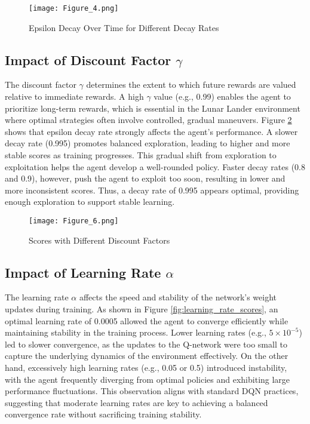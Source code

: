 \documentclass[conference]{IEEEtran}
\begin{document}
\begin{figure}[h]
    \centering
    \texttt{[image: Figure\_4.png]}
    \caption{Epsilon Decay Over Time for Different Decay Rates}
    \label{fig:epsilon_decay_over_time}
\end{figure}

\subsection{Impact of Discount Factor $\gamma$}
The discount factor $\gamma$ determines the extent to which future rewards are valued relative to immediate rewards. A high $\gamma$ value (e.g., 0.99) enables the agent to prioritize long-term rewards, which is essential in the Lunar Lander environment where optimal strategies often involve controlled, gradual maneuvers. Figure \ref{fig:gamma_scores} shows that epsilon decay rate strongly affects the agent’s performance. A slower decay rate (0.995) promotes balanced exploration, leading to higher and more stable scores as training progresses. This gradual shift from exploration to exploitation helps the agent develop a well-rounded policy. Faster decay rates (0.8 and 0.9), however, push the agent to exploit too soon, resulting in lower and more inconsistent scores. Thus, a decay rate of 0.995 appears optimal, providing enough exploration to support stable learning.

\begin{figure}[h]
    \centering
    \texttt{[image: Figure\_6.png]}
    \caption{Scores with Different Discount Factors}
    \label{fig:gamma_scores}
\end{figure}

\subsection{Impact of Learning Rate $\alpha$}
The learning rate $\alpha$ affects the speed and stability of the network's weight updates during training. As shown in Figure \ref{fig:learning_rate_scores}, an optimal learning rate of 0.0005 allowed the agent to converge efficiently while maintaining stability in the training process. Lower learning rates (e.g., $5 \times 10^{-5}$) led to slower convergence, as the updates to the Q-network were too small to capture the underlying dynamics of the environment effectively. On the other hand, excessively high learning rates (e.g., 0.05 or 0.5) introduced instability, with the agent frequently diverging from optimal policies and exhibiting large performance fluctuations. This observation aligns with standard DQN practices, suggesting that moderate learning rates are key to achieving a balanced convergence rate without sacrificing training stability.
\end{document}
